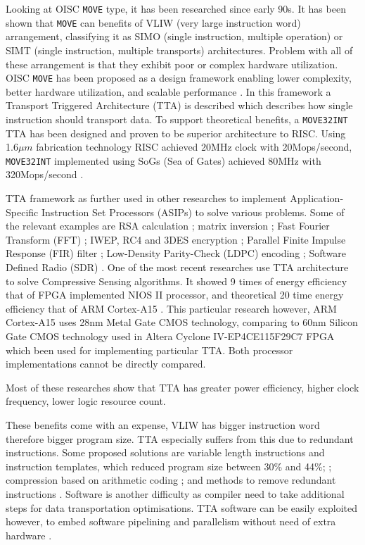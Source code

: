 Looking at OISC \texttt{MOVE} type, it has been researched since early 90s. It has been shown that \texttt{MOVE} can benefits of VLIW (very large instruction word) arrangement, classifying it as SIMO (single instruction, multiple operation) or SIMT (single instruction, multiple transports) architectures. Problem with all of these arrangement is that they exhibit poor or complex hardware utilization. OISC \texttt{MOVE} has been proposed as a design framework enabling lower complexity, better hardware utilization, and scalable performance \autocite{5348869}. In this framework a Transport Triggered Architecture (TTA) is described which describes how single instruction should transport data. To support theoretical benefits, a \texttt{MOVE32INT} TTA has been designed \autocite{Corporaal94move32int} and proven to be superior architecture to RISC. Using 1.6$\mu m$ fabrication technology RISC achieved 20MHz clock with 20Mops/second, \texttt{MOVE32INT} implemented using SoGs (Sea of Gates) achieved 80MHz with 320Mops/second \autocite{289981}.

TTA framework as further used in other researches to implement Application-Specific Instruction Set Processors (ASIPs) to solve various problems. Some of the relevant examples are RSA calculation \autocite{6128530}; matrix inversion \autocite{1540373}; Fast Fourier Transform (FFT) \autocite{8682289}; IWEP, RC4 and 3DES encryption \autocite{922340}; Parallel Finite Impulse Response (FIR) filter \autocite{1511285}; Low-Density Parity-Check (LDPC) encoding \autocite{6855236}; Software Defined Radio (SDR) \autocite{7363689}. One of the most recent researches use TTA architecture to solve Compressive Sensing algorithms. It showed 9 times of energy efficiency that of FPGA implemented NIOS II processor, and theoretical 20 time energy efficiency that of ARM Cortex-A15 \autocite{8573494}. This particular research however, ARM Cortex-A15 uses 28nm Metal Gate CMOS technology, comparing to 60nm Silicon Gate CMOS technology used in Altera Cyclone IV-EP4CE115F29C7 FPGA which been used for implementing particular TTA. Both processor implementations cannot be directly compared.

Most of these researches show that TTA has greater power efficiency, higher clock frequency, lower logic resource count. 

These benefits come with an expense, VLIW has bigger instruction word therefore bigger program size. TTA especially suffers from this due to redundant instructions. Some proposed solutions are variable length instructions and instruction templates, which reduced program size between 30\% and 44\%; \autocite{1213033,6893206}; compression based on arithmetic coding \autocite{4627144}; and methods to remove redundant instructions \autocite{5403730}. 
Software is another difficulty as compiler need to take additional steps for data transportation optimisations. TTA software can be easily exploited however, to embed software pipelining and parallelism without need of extra hardware \autocite{4595596}.

